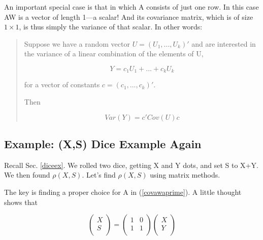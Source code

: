 An important special case is that in which A consists of just one row.
In this case AW is a vector of length 1---a scalar!  And its covariance
matrix, which is of size $1 \times 1$, is thus simply the variance of
that scalar.  In other words:

\begin{quote}

Suppose we have a random vector $U = (U_1,...,U_k)'$ and are interested
in the variance of a linear combination of the elements of U, 

\begin{equation}
\label{quadform1}
Y = c_1 U_1 + ...+ c_k U_k
\end{equation}

for a vector of constants $c = (c_1,...,c_k)'$.

Then

\begin{equation}
\label{quadform2}
Var(Y) =  c'Cov(U) c
\end{equation}

\end{quote}

\subsection{Example: (X,S) Dice Example Again}

Recall Sec. \ref{diceex}.  We rolled two dice, getting X and Y dots, and
set S to X+Y.  We then found $\rho(X,S)$.  Let's find
$\rho(X,S)$ using matrix methods.

The key is finding a proper choice for A in (\ref{covawaprime}).  A
little thought shows that

\begin{equation}
   \left (
   \begin{array}{r}
   X \\
   S \\
   \end{array}
   \right )
   =
   \left (
   \begin{array}{rr}
   1 & 0 \\
   1 & 1 \\
   \end{array}
   \right )
   \left (
   \begin{array}{r}
   X \\
   Y \\
   \end{array}
   \right )
\end{equation}

